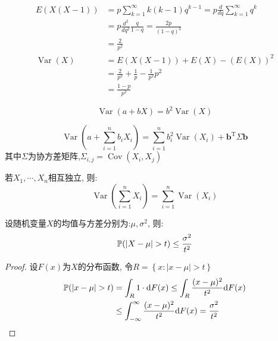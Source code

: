 \begin{example}[微分法求解几何分布方差]\label{ex:geometric_dist_var}
    \begin{align*}
        E(X(X-1))             & =p\sum_{k=1}^{\infty}k(k-1) q^{k-1}=p\frac{d}{d q}\sum_{k=1}^{\infty} q^{k} \\
                              & =p\frac{d^2}{d q^2} \frac{q}{1-q} =\frac{2p}{(1-q)^{3}}                     \\
                              & =\frac{2}{p^2}                                                              \\
        \operatorname{Var}(X) & =  E(X(X-1)) + E(X) - (E(X))^2                                              \\
                              & = \frac{2}{p^2} + \frac{1}{p} -\frac{1}{p^2} p^2                            \\
                              & = \frac{1-p}{p^2}
    \end{align*}
\end{example}

\begin{proposition}
    \[ \operatorname{Var}(a+bX)=b^2\operatorname{Var}(X) \]
\end{proposition}

\begin{proposition}
    \[ \operatorname{Var}(a+\sum_{i=1}^n b_i X_i)=\sum_{i=1}^n b_i^2 \operatorname{Var}(X_i)+\mathbf{b}^{\mathrm{T}} \Sigma \mathbf{b}\]
    其中$\Sigma$为协方差矩阵,$\Sigma_{i,j}=\operatorname{Cov}(X_i,X_j)$
\end{proposition}

\begin{corollary}
    若$X_1,\cdots ,X_n$相互独立, 则:
    \[ \operatorname{Var}(\sum_{i=1}^n X_i)=\sum_{i=1}^n\operatorname{Var}( X_i) \]
\end{corollary}

\begin{theorem}[Chebyshev不等式]
    设随机变量$X$的均值与方差分别为:$\mu, \sigma^2$, 则:
    \[ \P(\left| X-\mu \right| >t)\le \frac{\sigma^{2}}{t^{2}} \]
\end{theorem}

\begin{proof}
    设$F(x)$为$X$的分布函数, 令$R=\left\{ x:|x-\mu|>t \right\}$
    \begin{align*}
        \P(|x-\mu|>t) & = \int_R 1 \cdot  \d F(x) \le \int_R \frac{(x-\mu)^2}{t^{2}}\d F(x)                   \\
                      & \le \int_{-\infty}^{\infty}\frac{(x-\mu)^2}{t^{2}}\d F(x)  = \frac{\sigma^{2}}{t^{2}}
    \end{align*}
\end{proof}

